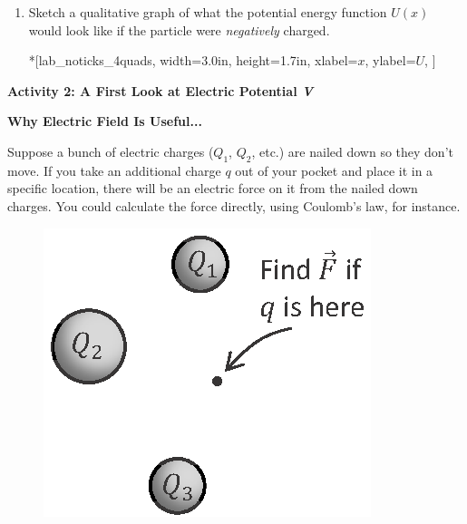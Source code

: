 \begin{enumerate}[labparts]
\item Sketch a qualitative graph of what the potential energy function $U(x)$ would look like if the particle were \textit{negatively} charged.

\begin{lab_axis}*[lab_noticks_4quads,
	width={3.0in}, height={1.7in},
	xlabel={$x$},
	ylabel={$U$},
	]
\end{lab_axis}

\end{enumerate}

\pagebreak[3]
\textbf{Activity 2: A First Look at Electric Potential \textit{V}}

\textbf{Why Electric Field Is Useful...}


Suppose a bunch of electric charges ($Q_1$, $Q_2$, etc.) are nailed down so they don't move.  If you take an additional charge $q$ out of your pocket and place it in a specific location, there will be an electric force on it from the nailed down charges.  You could calculate the force directly, using Coulomb's law, for instance.  
\begin{figure}
\begin{center}
\vspace{-0.3 in}
\includegraphics[scale=0.8]{potential_intro/activity_3_figs/charge_from_pocket.eps}
\end{center}
\end{figure}


